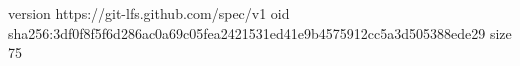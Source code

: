 version https://git-lfs.github.com/spec/v1
oid sha256:3df0f8f5f6d286ac0a69c05fea2421531ed41e9b4575912cc5a3d505388ede29
size 75
